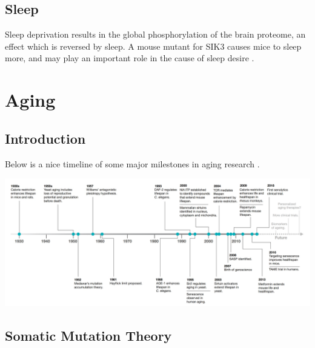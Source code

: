 \documentclass[]{book}
\newenvironment{Shaded}{\begin{snugshade}}{\end{snugshade}}
\newcommand{\KeywordTok}[1]{\textcolor[rgb]{0.13,0.29,0.53}{\textbf{#1}}}
\newcommand{\DataTypeTok}[1]{\textcolor[rgb]{0.13,0.29,0.53}{#1}}
\newcommand{\DecValTok}[1]{\textcolor[rgb]{0.00,0.00,0.81}{#1}}
\newcommand{\StringTok}[1]{\textcolor[rgb]{0.31,0.60,0.02}{#1}}
\newcommand{\OtherTok}[1]{\textcolor[rgb]{0.56,0.35,0.01}{#1}}
\newcommand{\OperatorTok}[1]{\textcolor[rgb]{0.81,0.36,0.00}{\textbf{#1}}}
\newcommand{\NormalTok}[1]{#1}
\begin{document}
\section{Sleep}\label{sleep}

Sleep deprivation results in the global phosphorylation of the brain
proteome, an effect which is reversed by sleep. A mouse mutant for SIK3
causes mice to sleep more, and may play an important role in the cause
of sleep desire \citep{wang2018quantitative}.

\chapter{Aging}\label{aging}

\section{Introduction}\label{introduction-2}

Below is a nice timeline of some major milestones in aging research
\citep{campisi2019discoveries}.

\begin{Shaded}
\end{Shaded}

\includegraphics{images/04-8.jpg}

\section{Somatic Mutation Theory}\label{somatic-mutation-theory}
\end{document}

